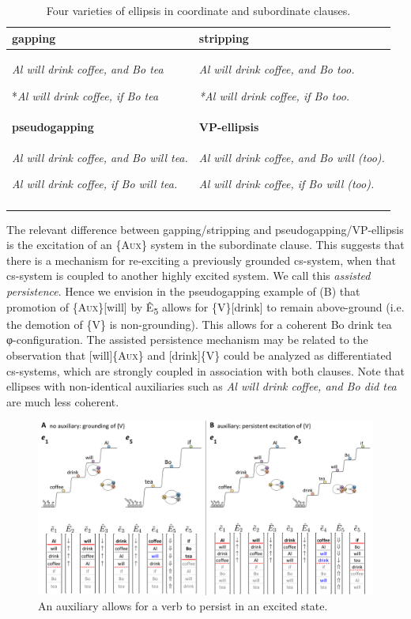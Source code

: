   
  
\begin{table}
\begin{tabularx}{\textwidth}{XX}
\lsptoprule
\textbf{gapping} & \textbf{stripping}\\
\midrule 

\textit{Al will drink coffee, and Bo tea}

*\textit{Al will drink coffee, if Bo tea} & \textit{Al will drink coffee, and Bo too.}

\textit{*Al will drink coffee, if Bo too.}  \\
\tablevspace

\textbf{pseudogapping} & \textbf{VP-ellipsis}\\
\midrule 
\textit{Al will drink coffee, and Bo will tea.}

\textit{Al will drink coffee, if Bo will tea.} & \textit{Al will drink coffee, and Bo will (too).}

\textit{Al will drink coffee, if Bo will (too).}\\
\lspbottomrule
\end{tabularx}
\caption{Four varieties of ellipsis in coordinate and subordinate clauses.}\label{tab:7:1}
\end{table}

  The relevant difference between gapping/stripping and pseudogapping/VP-ellipsis is the excitation of an \{A\textsc{ux}\} system in the subordinate clause. This suggests that there is a mechanism for re-exciting a previously grounded cs-system, when that cs-system is coupled to another highly excited system. We call this \textit{assisted persistence}. Hence we envision in the pseudogapping example of {}(B) that promotion of \{A\textsc{ux}\}[will] by Ê\textsubscript{5} allows for \{V\}[drink] to remain above-ground (i.e. the demotion of \{V\} is non-grounding). This allows for a coherent {\textbar}Bo drink tea{\textbar} φ-configuration. The assisted persistence mechanism may be related to the observation that [will]\{A\textsc{ux}\} and [drink]\{V\} could be analyzed as differentiated cs-systems, which are strongly coupled in association with both clauses. Note that ellipses with non-identical auxiliaries such as \textit{Al will drink coffee, and Bo did tea} are much less coherent.

  
\begin{figure}
\includegraphics[width=\textwidth]{figures/Tilsen-img147.png}
\caption{An auxiliary allows for a verb to persist in an excited state.}
\label{fig:7:3}
\end{figure}
 

